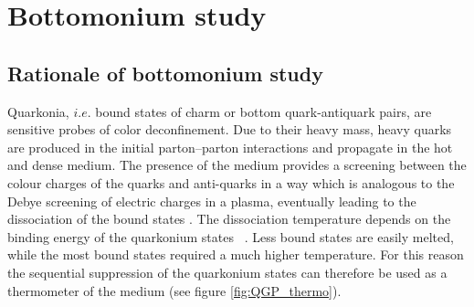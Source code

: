 \section{Bottomonium study}
\subsection{Rationale of bottomonium study} %

Quarkonia, $i.e.$ bound states of charm or bottom quark-antiquark pairs, are sensitive probes of color deconfinement. 
Due to their heavy mass, heavy quarks are produced in the initial parton--parton interactions and propagate in the hot and dense medium.
The presence of the medium provides a screening between the colour charges of the quarks and anti-quarks in a way which is analogous to the Debye screening of electric charges in a plasma, eventually leading to the dissociation of the bound states \cite{Matsui:1986dk,Brambilla:2010cs,Andronic:2015wma}.
The dissociation temperature depends on the binding energy of the quarkonium states ~\cite{Digal:2001ue}. 
Less bound states are easily melted, while the most bound states required a much higher temperature.
For this reason the sequential suppression of the quarkonium states can therefore be used as a thermometer of the medium (see figure \ref{fig:QGP_thermo}).


